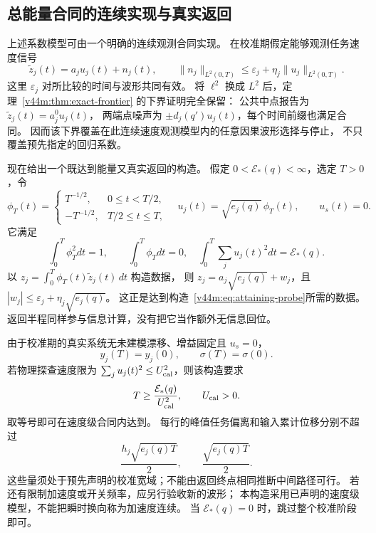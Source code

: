 \documentclass[11pt,a4paper]{article}
\numberwithin{equation}{section}
\theoremstyle{definition}
\begin{document}
\subsection{总能量合同的连续实现与真实返回}

上述系数模型可由一个明确的连续观测合同实现。
在校准期假定能够观测任务速度信号
\begin{equation}
 \widetilde z_j(t)=a_j u_j(t)+n_j(t),\qquad
 \|n_j\|_{L^2(0,T)}\le
 \varepsilon_j+\eta_j\|u_j\|_{L^2(0,T)}.
 \label{v44m:eq:continuous-noise-oracle}
\end{equation}
这里 $\varepsilon_j$ 对所比较的时间与波形共同有效。
将 $\ell^2$ 换成 $L^2$ 后，定理~\ref{v44m:thm:exact-frontier} 的下界证明完全保留：
公共中点报告为 $\widetilde z_j(t)=a_j^0u_j(t)$，
两端点噪声为 $\pm d_j(q')u_j(t)$，每个时间前缀也满足合同。
因而该下界覆盖在此连续速度观测模型内的任意因果波形选择与停止，
不只覆盖预先指定的回归系数。

现在给出一个既达到能量又真实返回的构造。
假定 $0<\mathcal E_*(q)<\infty$，选定 $T>0$，令
\begin{equation}
 \phi_T(t)=
 \begin{cases}
 T^{-1/2},&0\le t<T/2,\\
 -T^{-1/2},&T/2\le t\le T,
 \end{cases}
 \quad
 u_j(t)=\sqrt{e_j(q)}\,\phi_T(t),\qquad u_s(t)=0.
 \label{v44m:eq:returning-waveform}
\end{equation}
它满足
\begin{equation}
 \int_0^T\phi_T^2dt=1,\qquad
 \int_0^T\phi_Tdt=0,
 \quad\int_0^T\sum_j u_j(t)^2dt=\mathcal E_*(q).
\end{equation}
以 $z_j=\int_0^T\phi_T(t)\widetilde z_j(t)\,dt$ 构造数据，
则 $z_j=a_j\sqrt{e_j(q)}+w_j$，且
$|w_j|\le\varepsilon_j+\eta_j\sqrt{e_j(q)}$。
这正是达到构造~\eqref{v44m:eq:attaining-probe}所需的数据。
返回半程同样参与信息计算，没有把它当作额外无信息回位。

由于校准期的真实系统无未建模漂移、增益固定且 $u_s=0$，
\begin{equation}
 y_j(T)=y_j(0),\qquad \sigma(T)=\sigma(0).
 \label{v44m:eq:exact-return}
\end{equation}
若物理探查速度限为 $\sum_j u_j(t)^2\le U_{\rm cal}^2$，则该构造要求
\begin{equation}
 T\ge\frac{\mathcal E_*(q)}{U_{\rm cal}^2},
 \qquad U_{\rm cal}>0.
 \label{v44m:eq:calibration-time}
\end{equation}
取等号即可在速度级合同内达到。
每行的峰值任务偏离和输入累计位移分别不超过
\begin{equation}
 \frac{h_j\sqrt{e_j(q)T}}2,
 \qquad \frac{\sqrt{e_j(q)T}}2.
 \label{v44m:eq:calibration-wide-domain}
\end{equation}
这些量须处于预先声明的校准宽域；不能由返回终点相同推断中间路径可行。
若还有限制加速度或开关频率，应另行验收新的波形；
本构造采用已声明的速度级模型，不能把瞬时换向称为加速度连续。
当 $\mathcal E_*(q)=0$ 时，跳过整个校准阶段即可。
\end{document}

